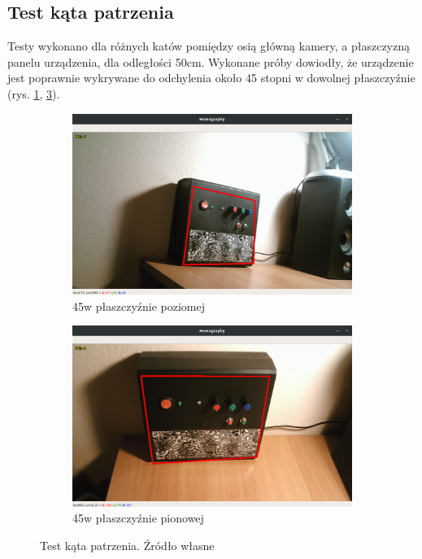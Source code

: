 \documentclass[12pt,twoside,polish]{article}
\begin{document}
\subsection{Test kąta patrzenia}
Testy wykonano dla różnych katów pomiędzy osią główną kamery, a płaszczyzną panelu urządzenia, dla odległości 50cm. Wykonane próby dowiodły, że urządzenie jest poprawnie wykrywane do odchylenia około 45 stopni w dowolnej płaszczyźnie (rys. \ref{test_angl1}, \ref{test_angl2}).

\begin{figure}[htb!]
	\begin{subfigure}{0.5\textwidth}
		\includegraphics[width=\textwidth]{test_angle1}
		\caption{45\degree w płaszczyźnie poziomej}
		\label{test_angl1}
	\end{subfigure}
	\begin{subfigure}{0.5\textwidth}
		\includegraphics[width=\textwidth]{test_angle2}
		\caption{45\degree w płaszczyźnie pionowej}
		\label{test_angl2}
	\end{subfigure}
	\caption{Test kąta patrzenia. Źródło własne}
\end{figure}
\FloatBarrier
\end{document}
